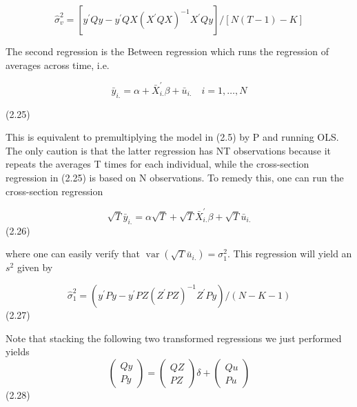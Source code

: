 \documentclass[
]{book}
\begin{document}
\begin{equation}
\widehat{\sigma}_{v}^{2}=\left[y^{\prime} Q y-y^{\prime} Q X\left(X^{\prime} Q X\right)^{-1} X^{\prime} Q y\right] /[N(T-1)-K]
\end{equation}

The second regression is the Between regression which runs the regression of averages across time, i.e.

\begin{equation}
\bar{y}_{i .}=\alpha+\bar{X}_{i .}^{\prime} \beta+\bar{u}_{i .} \quad i=1, \ldots, N
\end{equation}

(2.25)

This is equivalent to premultiplying the model in (2.5) by P and running OLS. The only caution is that the latter regression has NT observations because it repeats the averages T times for each individual, while the cross-section regression in (2.25) is based on N observations. To remedy this, one can run the cross-section regression

\begin{equation}
\sqrt{T} \bar{y}_{i .}=\alpha \sqrt{T}+\sqrt{T} \bar{X}_{i .}^{\prime} \beta+\sqrt{T} \bar{u}_{i .}
\end{equation} (2.26)

where one can easily verify that \(\operatorname{var}\left(\sqrt{T} \bar{u}_{i .}\right)=\sigma_{1}^{2} .\) This regression will yield an \(s^{2}\) given by

\begin{equation}
\widehat{\sigma}_{1}^{2}=\left(y^{\prime} P y-y^{\prime} P Z\left(Z^{\prime} P Z\right)^{-1} Z^{\prime} P y\right) /(N-K-1)
\end{equation} (2.27)

Note that stacking the following two transformed regressions we just performed yields \begin{equation}
\left(\begin{array}{l}
Q y \\
P y
\end{array}\right)=\left(\begin{array}{l}
Q Z \\
P Z
\end{array}\right) \delta+\left(\begin{array}{c}
Q u \\
P u
\end{array}\right)
\end{equation} (2.28)
\end{document}

